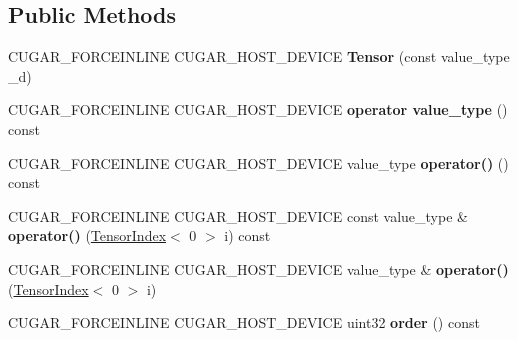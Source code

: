 \subsection*{Public Methods}
\begin{DoxyCompactItemize}
\item 
\mbox{\label{structcugar_1_1_tensor_3_01_t_00_010_00_01_n_01_4_a9397e65f1b68d7e083543c6745b61531}} 
C\+U\+G\+A\+R\+\_\+\+F\+O\+R\+C\+E\+I\+N\+L\+I\+NE C\+U\+G\+A\+R\+\_\+\+H\+O\+S\+T\+\_\+\+D\+E\+V\+I\+CE {\bfseries Tensor} (const value\+\_\+type \+\_\+d)
\item 
\mbox{\label{structcugar_1_1_tensor_3_01_t_00_010_00_01_n_01_4_a6a9f93386bff57a055bd064067b8b9b1}} 
C\+U\+G\+A\+R\+\_\+\+F\+O\+R\+C\+E\+I\+N\+L\+I\+NE C\+U\+G\+A\+R\+\_\+\+H\+O\+S\+T\+\_\+\+D\+E\+V\+I\+CE {\bfseries operator value\+\_\+type} () const
\item 
\mbox{\label{structcugar_1_1_tensor_3_01_t_00_010_00_01_n_01_4_aaf9c25494603f65421d4090f7faf7e3e}} 
C\+U\+G\+A\+R\+\_\+\+F\+O\+R\+C\+E\+I\+N\+L\+I\+NE C\+U\+G\+A\+R\+\_\+\+H\+O\+S\+T\+\_\+\+D\+E\+V\+I\+CE value\+\_\+type {\bfseries operator()} () const
\item 
\mbox{\label{structcugar_1_1_tensor_3_01_t_00_010_00_01_n_01_4_aa475170bd80cd889edb583144241e4fc}} 
C\+U\+G\+A\+R\+\_\+\+F\+O\+R\+C\+E\+I\+N\+L\+I\+NE C\+U\+G\+A\+R\+\_\+\+H\+O\+S\+T\+\_\+\+D\+E\+V\+I\+CE const value\+\_\+type \& {\bfseries operator()} (\hyperlink{structcugar_1_1_tensor_index}{Tensor\+Index}$<$ 0 $>$ i) const
\item 
\mbox{\label{structcugar_1_1_tensor_3_01_t_00_010_00_01_n_01_4_afb64e18da772ae0c5a89f5803074211c}} 
C\+U\+G\+A\+R\+\_\+\+F\+O\+R\+C\+E\+I\+N\+L\+I\+NE C\+U\+G\+A\+R\+\_\+\+H\+O\+S\+T\+\_\+\+D\+E\+V\+I\+CE value\+\_\+type \& {\bfseries operator()} (\hyperlink{structcugar_1_1_tensor_index}{Tensor\+Index}$<$ 0 $>$ i)
\item 
\mbox{\label{structcugar_1_1_tensor_3_01_t_00_010_00_01_n_01_4_a9d23dec6d7a198d48c98bbbf870aad1f}} 
C\+U\+G\+A\+R\+\_\+\+F\+O\+R\+C\+E\+I\+N\+L\+I\+NE C\+U\+G\+A\+R\+\_\+\+H\+O\+S\+T\+\_\+\+D\+E\+V\+I\+CE uint32 {\bfseries order} () const
\end{DoxyCompactItemize}
